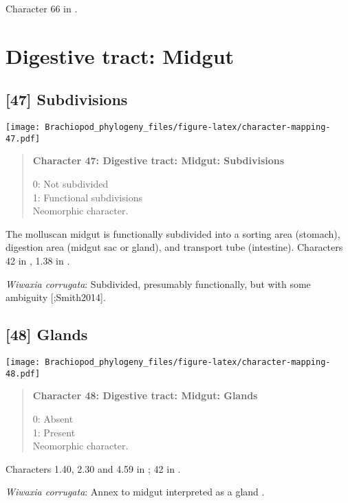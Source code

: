 \documentclass[openany]{book}
\theoremstyle{definition}
\theoremstyle{definition}
\theoremstyle{definition}
\theoremstyle{remark}
\begin{document}
Character 66 in \citet{Haszprunar2000}.

\section{Digestive tract: Midgut}\label{digestive-tract-midgut}

\subsection*{{[}47{]} Subdivisions}\label{subdivisions}

\texttt{[image: Brachiopod\_phylogeny\_files/figure-latex/character-mapping-47.pdf]}

\begin{quote}
\textbf{Character 47: Digestive tract: Midgut: Subdivisions}

0: Not subdivided\\
1: Functional subdivisions\\
Neomorphic character.
\end{quote}

The molluscan midgut is functionally subdivided into a sorting area
(stomach), digestion area (midgut sac or gland), and transport tube
(intestine). Characters 42 in \citet{Haszprunar2000}, 1.38 in
\citet{SPS1996}.

\hypertarget{Wiwaxia_corrugata-coding-47}{}
\emph{Wiwaxia corrugata}: Subdivided, presumably functionally, but with
some ambiguity {[}\citet{Smith2012M};Smith2014{]}.

\subsection*{{[}48{]} Glands}\label{glands}

\texttt{[image: Brachiopod\_phylogeny\_files/figure-latex/character-mapping-48.pdf]}

\begin{quote}
\textbf{Character 48: Digestive tract: Midgut: Glands}

0: Absent\\
1: Present\\
Neomorphic character.
\end{quote}

Characters 1.40, 2.30 and 4.59 in \citet{SPS1996}; 42 in
\citet{Haszprunar2000}.

\hypertarget{Wiwaxia_corrugata-coding-48}{}
\emph{Wiwaxia corrugata}: Annex to midgut interpreted as a gland
\citep{Smith2012M}.
\end{document}
